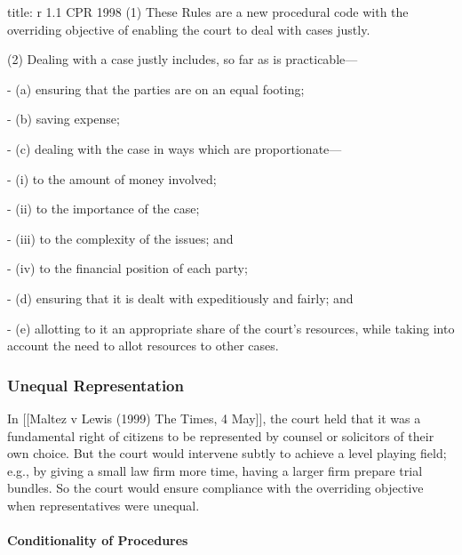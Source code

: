 \documentclass[
]{article}
\newenvironment{Shaded}{}{}
\newcommand{\NormalTok}[1]{#1}
\begin{document}
\begin{Shaded}
\begin{Highlighting}[]
\NormalTok{title: r 1.1 CPR 1998}
\NormalTok{(1) These Rules are a new procedural code with the overriding objective of enabling the court to deal with cases justly.}

\NormalTok{(2) Dealing with a case justly includes, so far as is practicable—}

\NormalTok{{-} (a) ensuring that the parties are on an equal footing;}

\NormalTok{{-} (b) saving expense;}

\NormalTok{{-} (c) dealing with the case in ways which are proportionate—}

\NormalTok{    {-} (i) to the amount of money involved;}
    
\NormalTok{    {-} (ii) to the importance of the case;}
    
\NormalTok{    {-} (iii) to the complexity of the issues; and}
    
\NormalTok{    {-} (iv) to the financial position of each party;}

\NormalTok{{-} (d) ensuring that it is dealt with expeditiously and fairly; and}

\NormalTok{{-} (e) allotting to it an appropriate share of the court’s resources, while taking into account the need to allot resources to other cases.}
\end{Highlighting}
\end{Shaded}

\hypertarget{unequal-representation}{%
\subsubsection{Unequal Representation}\label{unequal-representation}}

In {[}{[}Maltez v Lewis (1999) The Times, 4 May{]}{]}, the court held
that it was a fundamental right of citizens to be represented by counsel
or solicitors of their own choice. But the court would intervene subtly
to achieve a level playing field; e.g., by giving a small law firm more
time, having a larger firm prepare trial bundles. So the court would
ensure compliance with the overriding objective when representatives
were unequal.

\hypertarget{conditionality-of-procedures}{%
\paragraph{Conditionality of
Procedures}\label{conditionality-of-procedures}}
\end{document}
